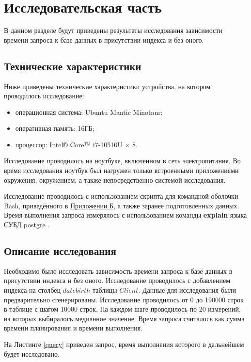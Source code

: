 \chapter{Исследовательская часть}

В данном разделе будут приведены результаты исследования зависимости времени запроса к базе данных в присутствии индекса и без оного.

\section{Технические характеристики}
Ниже приведены технические характеристики устройства, на котором проводилось исследование:

\begin{itemize}
	\item операционная система: Ubuntu Mantic Minotaur;
	\item оперативная память: 16ГБ;
	\item процессор: Intel® Core™ i7-10510U × 8.
\end{itemize}

Исследование проводилось на ноутбуке, включенном в сеть электропитания. 
Во время исследования ноутбук был нагружен только встроенными приложениями окружения, окружением, а также непосредственно системой исследования. 

Исследование проводилось с использованием скрипта для командной оболочки Bash\cite{bashman}, приведённого в \hyperref[chp:Appendix2]{Приложении Б}, а также заранее подготовленных данных. 
Время выполнения запроса измерялось с использованием команды \textbf{explain} языка СУБД postgre \cite{timeman}. 

\section{Описание исследования}

Необходимо было исследовать зависимость времени запроса к базе данных в присутствии индекса и без оного. 
Исследование проводилось с добавлением индекса на столбец $datebirth$ таблицы $Client$. 
Данные для исследования были предварительно сгенерированы. 
Исследование проводилось от 0 до 190000 строк в таблице с шагом 10000 строк. 
На каждом шаге проводилось по 20 измерений, из которых выбиралось медианное значение. 
Время запроса считалось как сумма времени планирования и времени выполнения.

На Листинге \ref{query} приведен запрос, время выполнения которого в дальнейшем будет исследовано.

